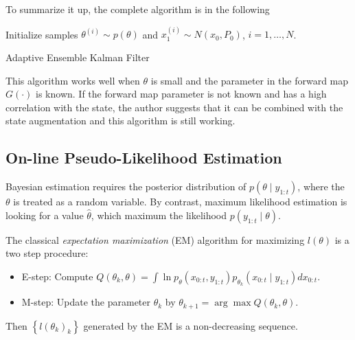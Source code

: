 To summarize it up, the complete algorithm is in the following 
\begin{algorithm}[h]
\SetAlgoLined 
Initialize samples $\theta^{(i)}\sim p(\theta)$ and $x_1^{(i)}\sim N(x_0,P_0)$, $i=1,\ldots,N$. \\
\caption{Adaptive Ensemble Kalman Filter}\label{algorithmEnKF}
\end{algorithm}

This algorithm works well when $\theta$ is small and the parameter in the forward map $G(\cdot)$ is known. If the forward map parameter is not known and has a high correlation with the state, the author suggests that it can be combined with the state augmentation \citep{anderson2001ensemble} and this algorithm is still working. 



\subsection{On-line Pseudo-Likelihood Estimation}

Bayesian estimation requires the posterior distribution of $p(\theta\mid y_{1:t})$, where the $\theta$ is treated as a random variable. By contrast, maximum likelihood estimation is looking for a value $\hat{\theta}$, which maximum the likelihood $p(y_{1:t}\mid \theta)$. 

The classical \textit{expectation maximization} (EM) algorithm \citep{dempster1977maximum} for maximizing $l(\theta)$ is a two step procedure: 
\begin{itemize}
\item{E-step}:   Compute  $Q(\theta_k,\theta)=\int \ln p_\theta(x_{0:t},y_{1:t})p_{\theta_k}(x_{0:t}\mid y_{1:t}) dx_{0:t}$. 
\item{M-step}: Update the parameter $\theta_k$ by $\theta_{k+1}=\arg \max Q(\theta_k,\theta)$.
\end{itemize}
Then $\left\lbrace l(\theta_k)_k\right\rbrace$ generated by the EM is a non-decreasing sequence.  

